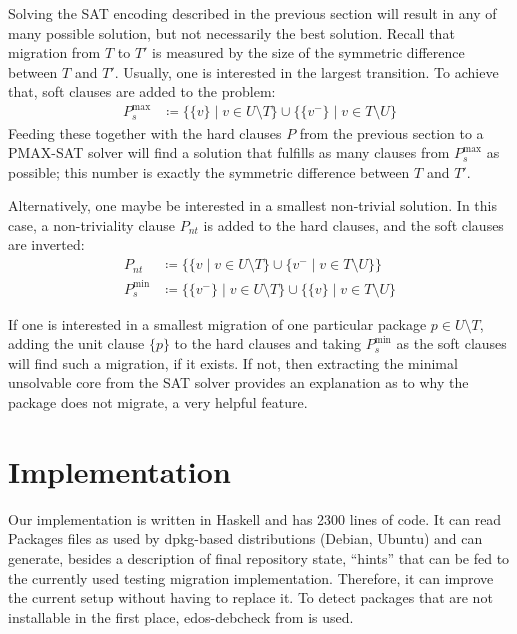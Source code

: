\documentclass[halfparskip,11pt]{scrartcl}
\begin{document}
Solving the SAT encoding described in the previous section will result in any of many possible solution, but not necessarily the best solution. Recall that migration from $T$ to $T'$ is measured by the size of the symmetric difference between $T$ and $T'$. Usually, one is interested in the largest transition. To achieve that, soft clauses are added to the problem:
\begin{align*}
P_s^{\text{max}} &\coloneqq \{ \{v\} \mid v \in U\setminus T\} \cup \{ \{v^-\} \mid v \in T\setminus U\}
\end{align*}
Feeding these together with the hard clauses $P$ from the previous section to a PMAX-SAT solver will find a solution that fulfills as many clauses from $P_s^{\text{max}}$ as possible; this number is exactly the symmetric difference between $T$ and $T'$.

Alternatively, one maybe be interested in a smallest non-trivial solution. In this case, a non-triviality clause $P_{nt}$ is added to the hard clauses, and the soft clauses are inverted:
\begin{align*}
P_{nt} &\coloneqq \{ \{ v \mid v \in U\setminus T\} \cup \{v^- \mid v \in T\setminus U\} \} \\
P_s^{\text{min}} &\coloneqq \{ \{v^-\} \mid v \in U\setminus T\} \cup \{ \{v\} \mid v \in T\setminus U\}
\end{align*}

If one is interested in a smallest migration of one particular package $p\in U\setminus T$, adding the unit clause $\{p\}$ to the hard clauses and taking $P_s^{\text{min}}$ as the soft clauses will find such a migration, if it exists. If not, then extracting the minimal unsolvable core from the SAT solver provides an explanation as to why the package does not migrate, a very helpful feature.

\section{Implementation}

Our implementation is written in Haskell and has 2300 lines of code. It can read Packages files as used by dpkg-based distributions (Debian, Ubuntu) and can generate, besides a description of final repository state, “hints” that can be fed to the currently used testing migration implementation. Therefore, it can improve the current setup without having to replace it. To detect packages that are not installable in the first place, edos-debcheck from \cite{edos} is used.
\end{document}
